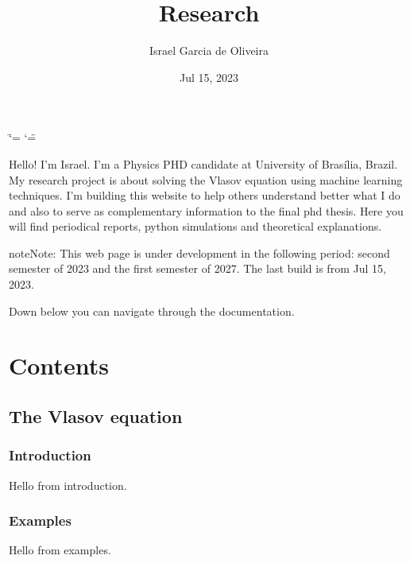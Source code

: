 \documentclass[letterpaper,10pt,english]{sphinxmanual}
\title{Research}
\date{Jul 15, 2023}
\author{Israel Garcia de Oliveira}
\begin{document}
\ifdefined\shorthandoff
  \ifnum\catcode`\=\string=\active\shorthandoff{=}\fi
  \ifnum\catcode`\"=\active{}\fi
\fi

\pagestyle{empty}
\sphinxmaketitle
\pagestyle{plain}
\sphinxtableofcontents
\pagestyle{normal}
\label{\detokenize{index::doc}}


\sphinxAtStartPar
Hello! I’m Israel. I’m a Physics PHD candidate at University of Brasília, Brazil.
My research project is about solving the Vlasov equation using machine learning
techniques. I’m building this website to help others understand better what I do
and also to serve as complementary information to the final phd thesis. Here you
will find periodical reports, python simulations and theoretical explanations.

\begin{sphinxadmonition}{note}{Note:}
\sphinxAtStartPar
This web page is under development in the following period: second semester of
2023 and the first semester of 2027. The last build is from Jul 15, 2023.
\end{sphinxadmonition}

\sphinxAtStartPar
Down below you can navigate through the documentation.


\chapter{Contents}
\label{\detokenize{index:contents}}
\sphinxstepscope

\sphinxstepscope


\section{The Vlasov equation}
\label{\detokenize{content/explanations/vlasov_equation:the-vlasov-equation}}\label{\detokenize{content/explanations/vlasov_equation::doc}}\label{\detokenize{content/explanations/vlasov_equation::doc}}

\subsection{Introduction}
\label{\detokenize{content/explanations/vlasov_equation:introduction}}
\sphinxAtStartPar
Hello from introduction.


\subsection{Examples}
\label{\detokenize{content/explanations/vlasov_equation:examples}}
\sphinxAtStartPar
Hello from examples.



\renewcommand{\indexname}{Index}
\printindex
\end{document}
